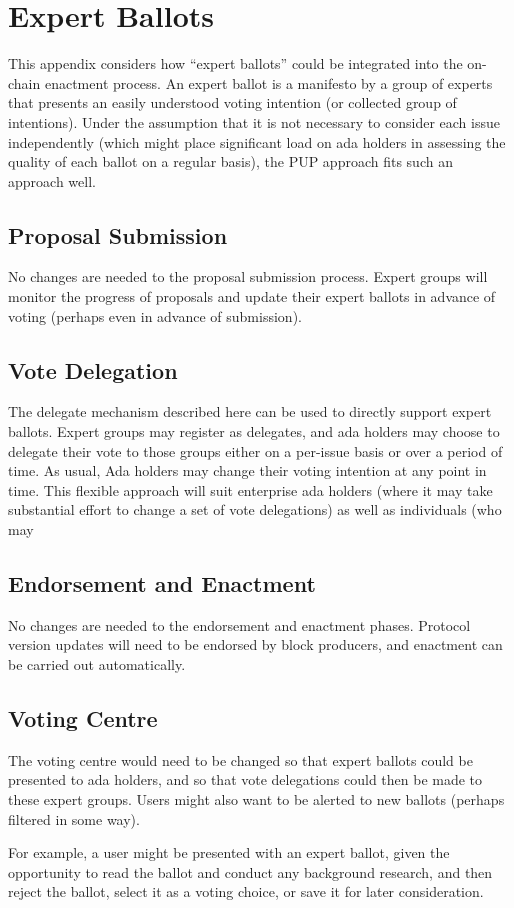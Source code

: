 \pagebreak
\section{Expert Ballots}
\label{sect:expert-ballots}

This appendix considers how ``expert ballots'' could be integrated into the on-chain enactment process.
An expert ballot is a manifesto by a group of experts that presents an easily understood voting intention
(or collected group of intentions).  Under the assumption that it is not necessary to consider each issue
independently (which might place significant load on ada holders in assessing the quality of each ballot on
a regular basis), the PUP approach fits such an approach well.

\subsection{Proposal Submission}

No changes are needed to the proposal submission process.  Expert groups will monitor the progress of proposals
and update their expert ballots in advance of voting (perhaps even in advance of submission).

\subsection{Vote Delegation}

The delegate mechanism described here can be used to directly support expert
ballots.  Expert groups may register as delegates, and ada holders may choose to
delegate their vote to those groups either on a per-issue basis or over a period
of time.  As usual, Ada holders may change their voting intention at any point in time.
This flexible approach will suit enterprise ada holders (where it may take substantial
effort to change a set of vote delegations) as well as individuals (who may

\subsection{Endorsement and Enactment}

No changes are needed to the endorsement and enactment phases.  Protocol version updates will need
to be endorsed by block producers, and enactment can be carried out automatically.


\subsection{Voting Centre}

The voting centre would need to be changed so that expert ballots could be presented to ada holders,
and so that vote delegations could then be made to these expert groups.  Users might also want
to be alerted to new ballots (perhaps filtered in some way).

For example, a user might be presented with an expert ballot, given the opportunity to read the ballot
and conduct any background research, and then reject the ballot, select it as a voting choice, or
save it for later consideration.
